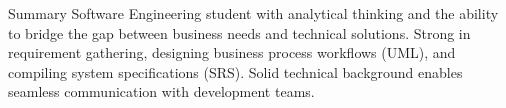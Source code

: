 \begin{rubric}{Summary}
\entry*[]%
    Software Engineering student with analytical thinking and the ability to bridge the gap between business needs and technical solutions. Strong in requirement gathering, designing business process workflows (UML), and compiling system specifications (SRS). Solid technical background enables seamless communication with development teams.
\end{rubric}